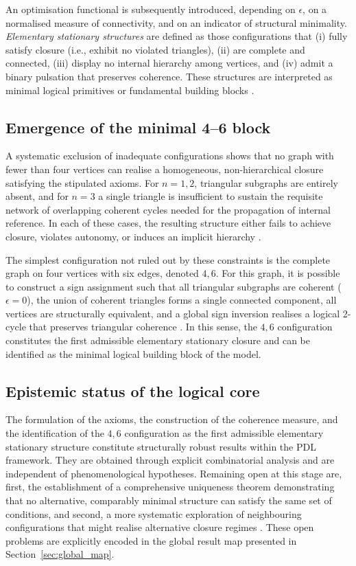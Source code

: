 \documentclass{article}
\begin{document}
An optimisation functional is subsequently introduced, depending on \(\epsilon\), on a normalised measure of connectivity, and on an indicator of structural minimality. \emph{Elementary stationary structures} are defined as those configurations that (i) fully satisfy closure (i.e., exhibit no violated triangles), (ii) are complete and connected, (iii) display no internal hierarchy among vertices, and (iv) admit a binary pulsation that preserves coherence. These structures are interpreted as minimal logical primitives or fundamental building blocks \citep{PDL_Main_2026,PDL_position}.

\subsection{Emergence of the minimal 4--6 block}
\label{subsec:4_6_block}

A systematic exclusion of inadequate configurations shows that no graph with fewer than four vertices can realise a homogeneous, non-hierarchical closure satisfying the stipulated axioms. For \(n = 1,2\), triangular subgraphs are entirely absent, and for \(n = 3\) a single triangle is insufficient to sustain the requisite network of overlapping coherent cycles needed for the propagation of internal reference. In each of these cases, the resulting structure either fails to achieve closure, violates autonomy, or induces an implicit hierarchy \citep{PDL_Main_2026}.

The simplest configuration not ruled out by these constraints is the complete graph on four vertices with six edges, denoted \(4,6\). For this graph, it is possible to construct a sign assignment such that all triangular subgraphs are coherent (\(\epsilon = 0\)), the union of coherent triangles forms a single connected component, all vertices are structurally equivalent, and a global sign inversion realises a logical 2-cycle that preserves triangular coherence
\citep{PDL_Main_2026,PDL_intro}. In this sense, the \(4,6\) configuration constitutes the first admissible elementary stationary closure and can be identified as the minimal logical building block of the model.

\subsection{Epistemic status of the logical core}
\label{subsec:logical_status}

The formulation of the axioms, the construction of the coherence measure, and the identification of the \(4,6\) configuration as the first admissible elementary stationary structure constitute structurally robust results within the PDL framework. They are obtained through explicit combinatorial analysis and are independent of phenomenological hypotheses. Remaining open at this stage are, first, the establishment of a comprehensive uniqueness theorem demonstrating that no alternative, comparably minimal structure can satisfy the same set of conditions, and second, a more systematic exploration of neighbouring configurations that might realise alternative closure regimes \citep{PDL_position}. These open problems are explicitly encoded in the global result map presented in Section~\ref{sec:global_map}.
\end{document}
